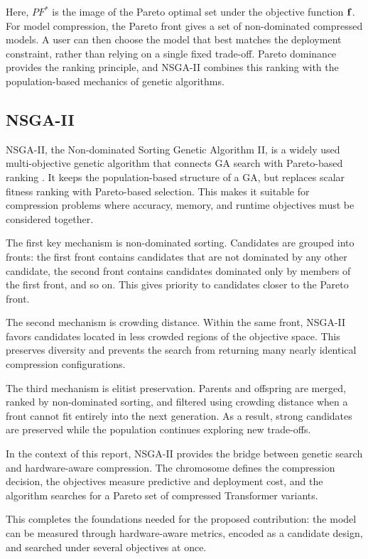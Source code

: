 Here, $PF^*$ is the image of the Pareto optimal set under the objective function $\mathbf{f}$. For model compression, the Pareto front gives a set of non-dominated compressed models. A user can then choose the model that best matches the deployment constraint, rather than relying on a single fixed trade-off. Pareto dominance provides the ranking principle, and NSGA-II combines this ranking with the population-based mechanics of genetic algorithms.

\subsection{NSGA-II}

NSGA-II, the Non-dominated Sorting Genetic Algorithm II, is a widely used multi-objective genetic algorithm that connects GA search with Pareto-based ranking \cite{deb2002fast}. It keeps the population-based structure of a GA, but replaces scalar fitness ranking with Pareto-based selection. This makes it suitable for compression problems where accuracy, memory, and runtime objectives must be considered together.

The first key mechanism is non-dominated sorting. Candidates are grouped into fronts: the first front contains candidates that are not dominated by any other candidate, the second front contains candidates dominated only by members of the first front, and so on. This gives priority to candidates closer to the Pareto front.

The second mechanism is crowding distance. Within the same front, NSGA-II favors candidates located in less crowded regions of the objective space. This preserves diversity and prevents the search from returning many nearly identical compression configurations.

The third mechanism is elitist preservation. Parents and offspring are merged, ranked by non-dominated sorting, and filtered using crowding distance when a front cannot fit entirely into the next generation. As a result, strong candidates are preserved while the population continues exploring new trade-offs.

In the context of this report, NSGA-II provides the bridge between genetic search and hardware-aware compression. The chromosome defines the compression decision, the objectives measure predictive and deployment cost, and the algorithm searches for a Pareto set of compressed Transformer variants.

This completes the foundations needed for the proposed contribution: the model can be measured through hardware-aware metrics, encoded as a candidate design, and searched under several objectives at once.
